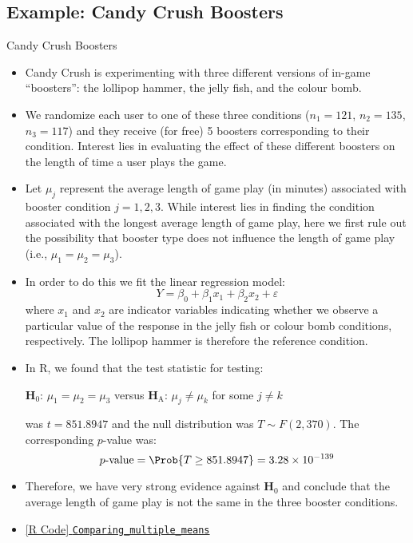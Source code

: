 \subsection{Example: Candy Crush Boosters}
\begin{Example}{Candy Crush Boosters}{}
    \begin{itemize}
        \item Candy Crush is experimenting with three different versions of
              in-game ``boosters'': the lollipop hammer, the jelly fish, and the colour bomb.
        \item We randomize each user to one of these three conditions ($ n_1 = 121 $,
              $ n_2 = 135 $, $ n_3 = 117$) and they
              receive (for free) 5
              boosters corresponding to their condition.
              Interest lies in evaluating the effect
              of these different boosters on the length of time a user plays the game.
        \item Let $ \mu_j $ represent the average length of game play
              (in minutes) associated with booster condition
              $ j = 1, 2, 3 $. While interest lies in finding the condition
              associated with the longest average length
              of game play, here we first rule out the possibility
              that booster type does not influence the length
              of game play (i.e., $ \mu_1=\mu_2=\mu_3 $).
        \item In order to do this we fit the linear regression model:
              \[ Y=\beta_0+\beta_1 x_1+\beta_2 x_2+\varepsilon \]
              where $ x_1 $ and $ x_2 $ are indicator variables indicating
              whether we observe a particular value of the response in the
              jelly fish or colour bomb conditions, respectively.
              The lollipop hammer is therefore the reference condition.
        \item In R, we found that the test statistic for testing:
              \begin{tightcenter}
                  $ \mathbf{H}_0 $: $ \mu_1=\mu_2=\mu_3 $ versus $ \mathbf{H}_\text{A} $: $ \mu_j\ne \mu_k $ for some $ j\ne k $
              \end{tightcenter}
              was $ t=851.8947 $ and the null distribution was $ T \sim F(2,370) $. The corresponding
              $ p $-value was:
              \[ p\text{-value}=\Prob{T\ge 851.8947}=3.28\times 10^{-139} \]
        \item Therefore, we have very strong evidence against $ \mathbf{H}_0 $ and conclude that the average
              length of game play is not the same in the three booster conditions.
        \item \href{https://github.com/Hextical/university-notes/blob/master/year-3/semester-3/STAT 430/code/W3/Comparing_multiple_means.R}{[R Code] \texttt{Comparing\_multiple\_means}}
    \end{itemize}
\end{Example}
